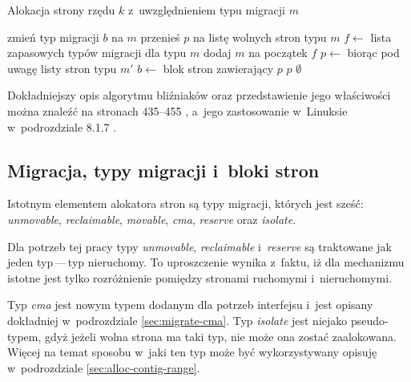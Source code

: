 \begin{algorithm}
\caption[Alokacja z~uwzględnieniem typu migracji.]{Alokacja strony
  rzędu $k$ z~uwzględnieniem typu migracji $m$}
\label{alg:buddy-fallback}
\begin{algorithmic}[1]
\State zmień typ migracji $b$ na $m$
    \State przenieś $p$ na listę wolnych stron typu $m$
\EndFor
\EndFunction
\Statex
{}
    \State $f \gets$ lista zapasowych typów migracji dla typu $m$
    \State dodaj $m$ na początek $f$
        \State $p \gets$  biorąc pod uwagę listy stron typu $m'$
                \State $b \gets$ blok stron zawierający $p$
                \State {}
            \EndIf
            \State \Return $p$
        \EndIf
    \EndFor
    \State \Return $\emptyset$
\EndFunction
\end{algorithmic}
\end{algorithm}
Dokładniejszy opis algorytmu bliźniaków oraz przedstawienie jego
właściwości można znaleźć na stronach 435--455
\autocite{bib:taocp-fa}, a~jego zastosowanie w~Linuksie w~podrozdziale
8.1.7 \autocite{bib:utlk}.


\subsection{Migracja, typy migracji i~bloki stron}\label{sec:migratetype}

Istotnym elementem alokatora stron są typy migracji, których jest
sześć: \textit{unmovable}, \textit{reclaimable}, \textit{movable},
\textit{cma}, \textit{reserve} oraz \textit{isolate}.

Dla potrzeb tej pracy typy \textit{unmovable}, \textit{reclaimable}
i~{\it reserve} są traktowane jak jeden typ\,---\,typ nieruchomy.  To
uproszczenie wynika z~faktu, iż dla mechanizmu  istotne jest tylko
rozróżnienie pomiędzy stronami ruchomymi i~nieruchomymi.

Typ \textit{cma} jest nowym typem dodanym dla potrzeb interfejsu 
i~jest opisany dokładniej w~podrozdziale \ref{sec:migrate-cma}.  Typ
\textit{isolate} jest niejako pseudo-typem, gdyż jeżeli wolna strona
ma taki typ, nie może ona zostać zaalokowana.  Więcej na temat sposobu
w~jaki ten typ może być wykorzystywany opisuję w~podrozdziale
\ref{sec:alloc-contig-range}.

